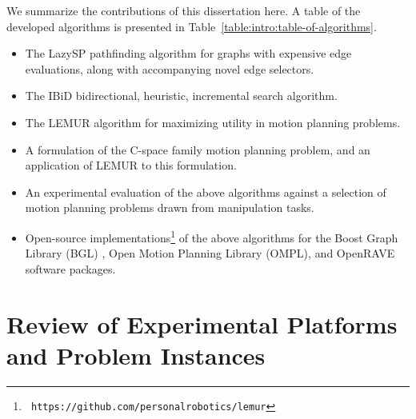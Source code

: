 We summarize the contributions of this dissertation here.
A table of the developed algorithms is presented in
Table~\ref{table:intro:table-of-algorithms}.

\begin{itemize}
\item The LazySP pathfinding algorithm for graphs with expensive
   edge evaluations,
   along with accompanying novel edge selectors.
\item The IBiD bidirectional, heuristic, incremental search algorithm.
\item The LEMUR algorithm for maximizing utility
   in motion planning problems.
\item A formulation of the C-space family motion planning problem,
   and an application of LEMUR to this formulation.
\item An experimental evaluation of the above algorithms against a
   selection of motion planning problems drawn from manipulation tasks.
\item Open-source implementations\footnote[][1cm]{\texttt{%
   https://github.com/personalrobotics/lemur}%
   }
   of the above algorithms for the
   Boost Graph Library (BGL) \citep{siek2001boostgraph},
   Open Motion Planning Library (OMPL), \citep{sucan2012ompl}
   and OpenRAVE \citep{diankov2010openrave} software packages.
\end{itemize}



\section{Review of Experimental Platforms and Problem Instances}

